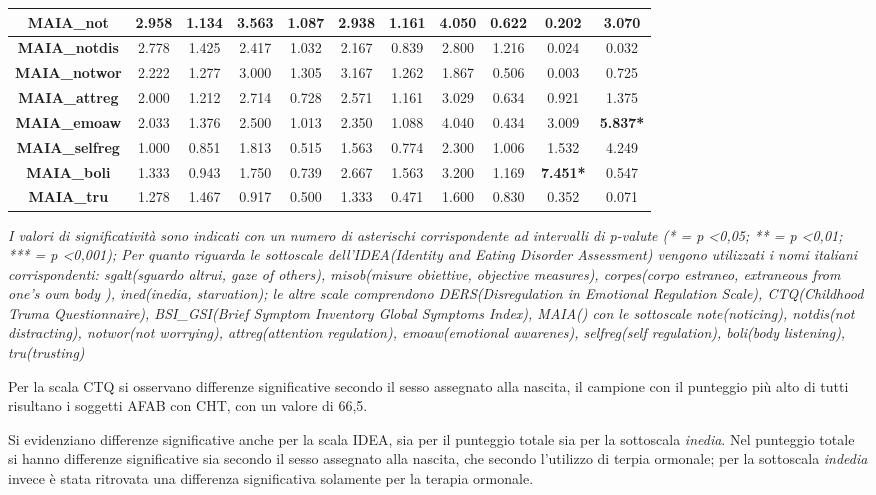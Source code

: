 \documentclass[12pt]{article}
\begin{document}
\begin{table}[H]
{{\begin{tabular}{|c|c|c|c|c|c|c|c|c||c|c|}
        \textbf{MAIA\_not} & 2.958 &1.134& 3.563 &1.087& 2.938 &1.161& 4.050 &0.622& 0.202&3.070\\\hline
        \textbf{MAIA\_notdis} & 2.778 &1.425& 2.417 &1.032& 2.167 &0.839& 2.800 &1.216& 0.024&0.032\\\hline
        \textbf{MAIA\_notwor }& 2.222 &1.277& 3.000 &1.305& 3.167 &1.262& 1.867 &0.506& 0.003&0.725\\\hline
        \textbf{MAIA\_attreg} & 2.000 &1.212& 2.714 &0.728& 2.571 &1.161& 3.029 &0.634& 0.921&1.375\\\hline
        \textbf{MAIA\_emoaw} & 2.033 &1.376& 2.500 &1.013& 2.350 &1.088& 4.040 &0.434& 3.009&\textbf{5.837*}\\\hline
        \textbf{MAIA\_selfreg} & 1.000 &0.851& 1.813 &0.515& 1.563 &0.774& 2.300 &1.006& 1.532&4.249\\\hline
        \textbf{MAIA\_boli} & 1.333 &0.943& 1.750 &0.739& 2.667 &1.563& 3.200 &1.169& \textbf{7.451*}&0.547\\\hline
        \textbf{MAIA\_tru} & 1.278 &1.467& 0.917 &0.500& 1.333 &0.471& 1.600 &0.830& 0.352&0.071\\\hline
    \end{tabular}%
    }}
    \label{tab:my_label}
    \footnotesize \textit{I valori di significatività sono indicati con un numero di asterischi corrispondente ad intervalli di p-valute (* = p <0,05; ** = p <0,01; *** = p <0,001); Per quanto riguarda le sottoscale dell'IDEA(Identity and Eating Disorder Assessment) vengono utilizzati i nomi italiani corrispondenti: sgalt(sguardo altrui, gaze of others), misob(misure obiettive, objective measures), corpes(corpo estraneo, extraneous from one's own body ), ined(inedia, starvation); le altre scale comprendono DERS(Disregulation in Emotional Regulation Scale), CTQ(Childhood Truma Questionnaire), BSI\_GSI(Brief Symptom Inventory Global Symptoms Index), MAIA() con le sottoscale note(noticing), notdis(not distracting), notwor(not worrying), attreg(attention regulation), emoaw(emotional awarenes), selfreg(self regulation), boli(body listening), tru(trusting)}
\end{table}

Per la scala CTQ si osservano differenze significative secondo il sesso assegnato alla nascita, il campione con il punteggio più alto di tutti risultano i soggetti AFAB con CHT, con un valore di 66,5.

Si evidenziano differenze significative anche per la scala IDEA, sia per il punteggio totale sia per la sottoscala \emph{inedia}. Nel punteggio totale si hanno differenze significative sia secondo il sesso assegnato alla nascita, che secondo l'utilizzo di terpia ormonale; per la sottoscala \emph{indedia} invece è stata ritrovata una differenza significativa solamente per la terapia ormonale.
\end{document}
